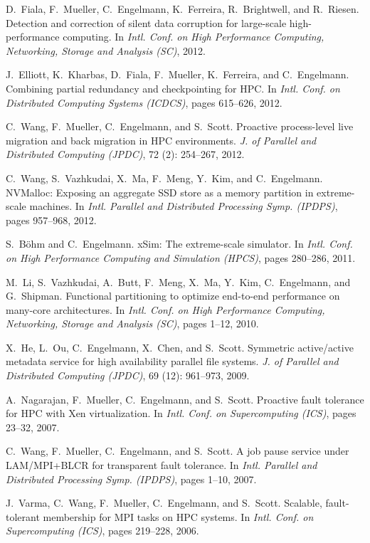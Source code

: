 \begin{compactenum}[{[}1{]}]
\item D.~Fiala, F.~Mueller, C.~Engelmann, K.~Ferreira, R.~Brightwell, and R.~Riesen. Detection and correction of silent data corruption for large-scale high-performance computing. In \emph{Intl. Conf. on High Performance Computing, Networking, Storage and Analysis (SC)}, 2012.
\item J.~Elliott, K.~Kharbas, D.~Fiala, F.~Mueller, K.~Ferreira, and C.~Engelmann. Combining partial redundancy and checkpointing for HPC. In \emph{Intl. Conf. on Distributed Computing Systems (ICDCS)}, pages 615--626, 2012.
\item C.~Wang, F.~Mueller, C.~Engelmann, and S.~Scott. Proactive process-level live migration and back migration in HPC environments. \emph{J. of Parallel and Distributed Computing (JPDC)}, 72 (2): 254--267, 2012.
\item C.~Wang, S.~Vazhkudai, X.~Ma, F.~Meng, Y.~Kim, and C.~Engelmann. NVMalloc: Exposing an aggregate SSD store as a memory partition in extreme-scale machines. In \emph{Intl. Parallel and Distributed Processing Symp. (IPDPS)}, pages 957--968, 2012.
\item S.~B{\"o}hm and C.~Engelmann. xSim: The extreme-scale simulator. In \emph{Intl. Conf. on High Performance Computing and Simulation (HPCS)}, pages 280--286, 2011.
\item M.~Li, S.~Vazhkudai, A.~Butt, F.~Meng, X.~Ma, Y.~Kim, C.~Engelmann, and G.~Shipman. Functional partitioning to optimize end-to-end performance on many-core architectures. In \emph{ Intl. Conf. on High Performance Computing, Networking, Storage and Analysis (SC)}, pages 1--12, 2010.
\item X.~He, L.~Ou, C.~Engelmann, X.~Chen, and S.~Scott. Symmetric active/active metadata service for high availability parallel file systems. \emph{J. of Parallel and Distributed Computing (JPDC)}, 69 (12): 961--973, 2009.
\item A.~Nagarajan, F.~Mueller, C.~Engelmann, and S.~Scott. Proactive fault tolerance for HPC with Xen virtualization. In \emph{Intl. Conf. on Supercomputing (ICS)}, pages 23--32, 2007.
\item C.~Wang, F.~Mueller, C.~Engelmann, and S.~Scott. A job pause service under {LAM/MPI+BLCR} for transparent fault tolerance. In \emph{Intl. Parallel and Distributed Processing Symp. (IPDPS)}, pages 1--10, 2007.
\item J.~Varma, C.~Wang, F.~Mueller, C.~Engelmann, and S.~Scott. Scalable, fault-tolerant membership for MPI tasks on HPC systems. In \emph{Intl. Conf. on Supercomputing (ICS)}, pages 219--228, 2006.
\end{compactenum}

